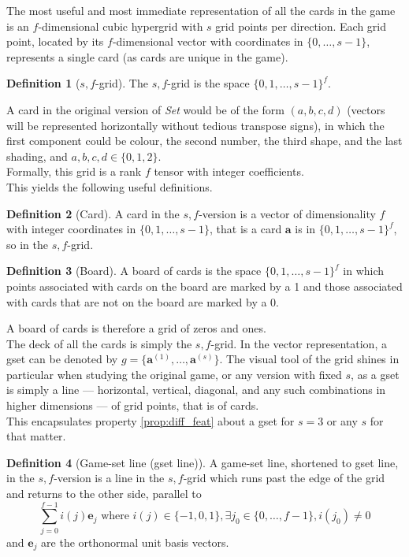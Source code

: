 \documentclass{article}
\theoremstyle{definition}
\newtheorem{defn}{Definition}
\theoremstyle{remark}
\begin{document}
The most useful and most immediate representation of all the cards in the game is an $f$-dimensional cubic hypergrid with $s$ grid points per direction. Each grid point, located by its $f$-dimensional vector with coordinates in $\{0,\dots,s-1\}$, represents a single card (as cards are unique in the game).
\begin{defn}[$s,f$-grid]\label{defn:grid}
    The $s,f$-grid is the space $\{0,1,\dots,s-1\}^f$.
\end{defn}
A card in the original version of \emph{Set} would be of the form $(a,b,c,d)$ (vectors will be represented horizontally without tedious transpose signs), in which the first component could be colour, the second number, the third shape, and the last shading, and $a,b,c,d\in\{0,1,2\}$.\\
Formally, this grid is a rank $f$ tensor with integer coefficients.\\
This yields the following useful definitions.
\begin{defn}[Card]\label{defn:card}
    A card in the $s,f$-version is a vector of dimensionality $f$ with integer coordinates in $\{0,1,\dots,s-1\}$, that is a card $\mathbf{a}$ is in $\{0,1,\dots,s-1\}^f$, so in the $s,f$-grid.
\end{defn}
\begin{defn}[Board]\label{defn:board}
    A board of cards is the space $\{0,1,\dots,s-1\}^f$ in which points associated with cards on the board are marked by a 1 and those associated with cards that are not on the board are marked by a 0.
\end{defn}
A board of cards is therefore a grid of zeros and ones.\\
The deck of all the cards is simply the $s,f$-grid.
In the vector representation, a gset can be denoted by $g=\{\mathbf{a}^{(1)},\dots,\mathbf{a}^{(s)}\}$.
\medbreak
The visual tool of the grid shines in particular when studying the original game, or any version with fixed $s$, as a gset is simply a line --- horizontal, vertical, diagonal, and any such combinations in higher dimensions --- of grid points, that is of cards.\\
This encapsulates property \ref{prop:diff_feat} about a gset for $s=3$ or any $s$ for that matter.
\begin{defn}[Game-set line (gset line)] \label{defn:gline}
    A game-set line, shortened to gset line, in the $s,f$-version is a line in the $s,f$-grid which runs past the edge of the grid and returns to the other side, parallel to \[\sum_{j=0}^{f-1}i(j)\mathbf{e}_j \text{ where } i(j)\in\{-1,0,1\}, \exists j_0\in\{0,\dots,f-1\}, i(j_0)\neq0 \] and $\mathbf{e}_j$ are the orthonormal unit basis vectors.
\end{defn}
\end{document}
